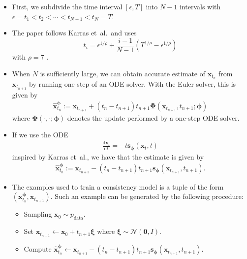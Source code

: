 \documentclass[10pt]{article}
\newcommand{\dee}{\mathrm{d}}
\newcommand{\ve}[1]{\mathbf{#1}}
\newcommand{\ves}[1]{\boldsymbol{#1}}
\newcommand{\etal}{{et~al.}}
\newcommand{\mcal}[1]{\mathcal{#1}}
\newcommand{\data}{\mathrm{data}}
\begin{document}
\begin{itemize}
  \item First, we subdivide the time interval $[\epsilon, T]$ into $N-1$ intervals with $\epsilon = t_1 < t_2 < \dotsm < t_{N-1} < t_N = T$.
  
  \item The paper follows Karras \etal\ and uses $$t_i = \epsilon^{1/\rho} + \frac{i-1}{N-1} (T^{1/\rho} - \epsilon^{1/\rho})$$ with $\rho = 7$ \cite{Karras:2022}.
  
  \item When $N$ is sufficiently large, we can obtain accurate estimate of $\ve{x}_{t_n}$ from $\ve{x}_{t_{n+1}}$ by running one step of an ODE solver. With the Euler solver, this is given by
  \begin{align*}
    \hat{\ve{x}}_{t_n}^{\ves{\phi}} := \ve{x}_{t_{n+1}} + (t_{n} - t_{n+1}) t_{n+1} \ve{\Phi}(\ve{x}_{t_{n+1}}, t_{n+1}; \ves{\phi})
  \end{align*}
  where $\ves{\Phi}(\cdot, \cdot; \ves{\phi})$ denotes the update performed by a one-step ODE solver.
  
  \item If we use the ODE
  \begin{align*}
    \frac{\dee\ve{x}_t}{\dee t} = -t \ve{s}_{\ves{\phi}}(\ve{x}_t, t)
  \end{align*}
  inspired by Karras \etal, we have that the estimate is given by
  \begin{align*}
    \hat{\ve{x}}_{t_n}^{\ves{\phi}} := \ve{x}_{t_{n+1}} - (t_{n} - t_{n+1}) t_{n+1} \ve{s}_{\ves{\phi}}(\ve{x}_{t_{n+1}}, t_{n+1}).
  \end{align*}

  \item The examples used to train a consistency model is a tuple of the form $(\ve{x}_{t_n}^{\ves{\phi}}, \ve{x}_{t_{n+1}})$. Such an example can be generated by the following procedure:
  \begin{itemize}
    \item Sampling $\ve{x}_0 \sim p_{\data}$.
    \item Set $\ve{x}_{t_{n+1}} \leftarrow \ve{x}_0 + t_{n+1}\ves{\xi}$ where $\ves{\xi} \sim \mcal{N}(\ve{0}, I)$.
    \item Compute $\hat{\ve{x}}_{t_n}^{\ves{\phi}} \leftarrow \ve{x}_{t_{n+1}} - (t_{n} - t_{n+1}) t_{n+1} \ve{s}_{\ves{\phi}}(\ve{x}_{t_{n+1}}, t_{n+1})$.
  \end{itemize}


\end{itemize}
\end{document}
